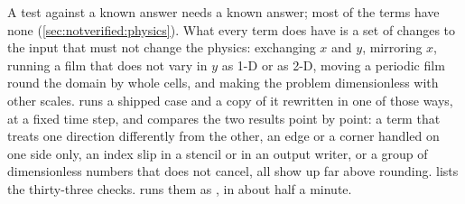 A test against a known answer needs a known answer; most of the terms have
none (\cref{sec:notverified:physics}). What every term does have is a set of
changes to the input that must not change the physics: exchanging $x$ and
$y$, mirroring $x$, running a film that does not vary in $y$ as 1-D or as
2-D, moving a periodic film round the domain by whole cells, and making the
problem dimensionless with other scales.  runs a
shipped case and a copy of it rewritten in one of those ways, at a fixed time
step, and compares the two results point by point: a term that treats one
direction differently from the other, an edge or a corner handled on one side
only, an index slip in a stencil or in an output writer, or a group of
dimensionless numbers that does not cancel, all show up far above rounding.
 lists the thirty-three checks.  runs them as
, in about half a minute.

